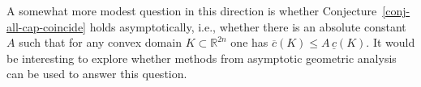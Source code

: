 \documentclass{icmart}
\theoremstyle{definition}
\begin{document}
\smallskip

A somewhat more modest question in this direction is whether Conjecture~\ref{conj-all-cap-coincide} holds asymptotically, i.e., whether there is an absolute constant $A$ such that for any convex domain $K \subset
{\mathbb R}^{2n}$ one has $\overline c(K) \leq A \, \underline c(K)$.  It would be interesting to explore whether methods from asymptotic geometric analysis can be used to answer this question. 
\bigskip
\end{document}
